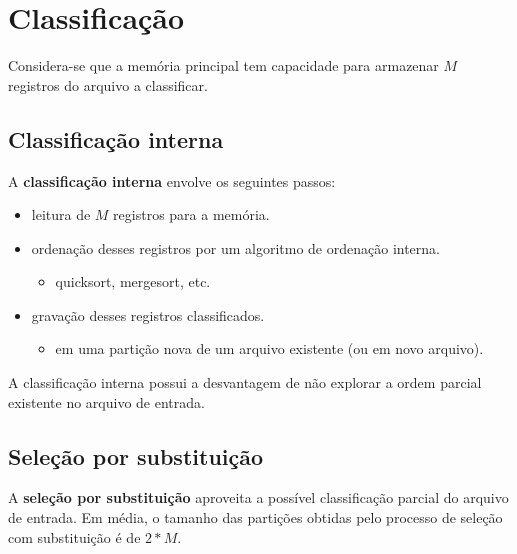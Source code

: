 \section{Classificação}

Considera-se que a memória principal tem capacidade para armazenar
$M$ registros do arquivo a classificar.

\subsection{Classificação interna}

A {\bf classificação interna} envolve os seguintes passos:
\begin{itemize}
\item leitura de $M$ registros para a memória.
\item ordenação desses registros por um algoritmo de ordenação interna.
	\begin{itemize}
	\item quicksort, mergesort, etc.
	\end{itemize}
\item gravação desses registros classificados.
	\begin{itemize}
	\item em uma partição nova de um arquivo existente (ou em novo arquivo).
	\end{itemize}
\end{itemize}

A classificação interna possui a desvantagem de não explorar a ordem
parcial existente no arquivo de entrada.

\subsection{Seleção por substituição}

A {\bf seleção por substituição}  aproveita a possível classificação
parcial do arquivo de entrada. 
Em média, o tamanho das partições obtidas pelo processo de seleção com substituição
é de $2 * M$.


